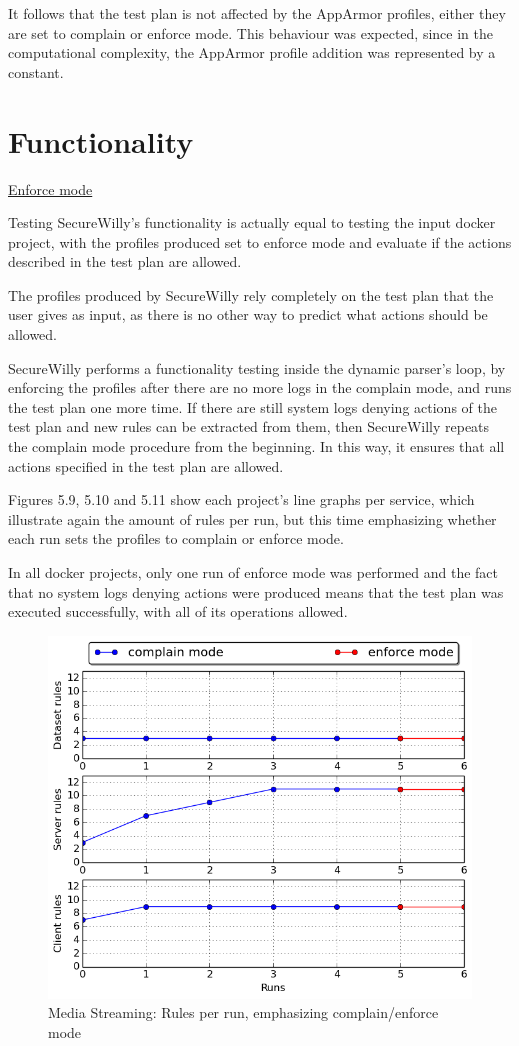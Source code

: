 It follows that the test plan is not affected by the AppArmor profiles, either they are set to complain or enforce mode. This behaviour was expected, since in the computational complexity, the AppArmor profile addition was represented by a constant.

\section{Functionality}
\underline{Enforce mode}
\hfill\break

Testing SecureWilly's functionality is actually equal to testing the input docker project, with the profiles produced set to enforce mode and evaluate if the actions described in the test plan are allowed.

The profiles produced by SecureWilly rely completely on the test plan that the user gives as input, as there is no other way to predict what actions should be allowed.  

SecureWilly performs a functionality testing inside the dynamic parser's loop, by enforcing the profiles after there are no more logs in the complain mode, and runs the test plan one more time. If there are still system logs denying actions of the test plan and new rules can be extracted from them, then SecureWilly repeats the complain mode procedure from the beginning. In this way, it ensures that all actions specified in the test plan are allowed.

Figures 5.9, 5.10 and 5.11 show each project's line graphs per service, which illustrate again the amount of rules per run, but this time emphasizing whether each run sets the profiles to complain or enforce mode.

In all docker projects, only one run of enforce mode was performed and the fact that no system logs denying actions were produced means that the test plan was executed successfully, with all of its operations allowed.

\hfill\break

\begin{figure}[h!]
  \centering
   \includegraphics[width=0.8\linewidth]{../figures/mediastreaming/complain_enforce_rules.png}
   \caption{Media Streaming: Rules per run, emphasizing complain/enforce mode}
\end{figure}

